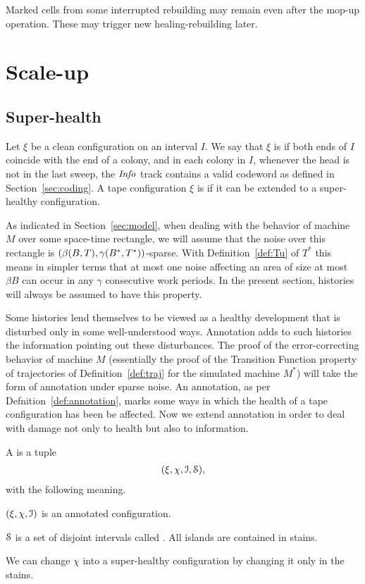 \documentclass[11pt]{memoir}
\theoremstyle{definition} %
\newcommand{\fld}[1]{\ensuremath{\textit{#1\/}}}
\def\B{B}
\newcommand{\Tu}{T}
\newcommand{\Tus}{T^{*}}
\newcommand{\Info}{\fld{Info}}
\begin{document}
Marked cells from some interrupted rebuilding may remain even after the mop-up operation.
These may trigger new healing-rebuilding later.


\section{Scale-up}

\subsection{Super-health}

\begin{definition}\label{def:super-health}
  Let \( \xi  \) be a clean configuration on an interval \( I \).
  We say that \( \xi \) is  if both ends of \( I \) coincide with the end of a 
  colony, and in each colony in \( I \), whenever the head is not in the last sweep, the \( \Info \)
  track contains a valid codeword as defined in Section~\ref{sec:coding}.
  A tape configuration \( \xi \) is 
  if it can be extended to a super-healthy configuration.
\end{definition}

As indicated in Section~\ref{sec:model}, when dealing with the behavior
of machine \( M \) over some space-time rectangle, we will assume that the noise
over this rectangle is \( (\beta\pair{\B}{\Tu}, \gamma\pair{\B^{*}}{\Tus}) \)-sparse.
With Definition~\ref{def:Tu} of \( \Tus \) this means 
in simpler terms that at most one noise  affecting an
area of size at most \( \beta\B \) can occur in any \( \gamma \) consecutive work periods.
In the present section, histories will always be assumed to have this property.

Some histories lend themselves to be viewed as a healthy development
that is disturbed only in some well-understood ways.
Annotation adds to such histories the information pointing out these disturbances.
The proof of the error-correcting behavior of machine \( M \)
(essentially the proof of the Transition Function
property of trajectories of Definition~\ref{def:traj} for the simulated machine \( M^{*} \))
will take the form of annotation under sparse noise.
An annotation, as per Defnition~\ref{def:annotation}, marks some ways in which the health 
of a tape configuration has been be affected.
Now we extend annotation in order to deal with damage not only to health but also to information.

\begin{definition}\label{def:super-annotation}
  A  is a tuple
  \begin{align*}
    (\xi,\chi, \mathcal{I}, \mathcal{S}),
  \end{align*}
  with the following meaning.

\( (\xi,\chi,\mathcal{I}) \) is an annotated configuration.

\( \mathcal{S} \) is a set of disjoint intervals called .
All islands are contained in stains.

We can change \( \chi \) into a super-healthy configuration by changing it only in the stains.
\end{definition}
\end{document}

